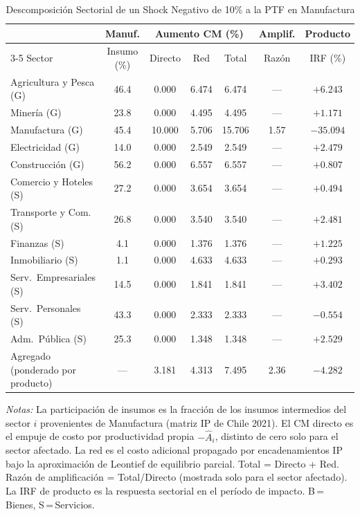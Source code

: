 \begin{table}[htbp]
\centering
\caption{Descomposición Sectorial de un Shock Negativo de 10\% a la PTF en Manufactura}
\label{tab:mfg_decomp}
\begin{threeparttable}
\small
\begin{tabular}{@{}l c c c c c c@{}}
\toprule
 & Manuf. & \multicolumn{3}{c}{Aumento CM (\%)} & Amplif. & Producto \\
\cmidrule(lr){3-5}
Sector & Insumo (\%) & Directo & Red & Total & Razón & IRF (\%) \\
\midrule
Agricultura y Pesca (G) & 46.4 & 0.000 & 6.474 & 6.474 & --- & $+6.243$ \\
Minería (G) & 23.8 & 0.000 & 4.495 & 4.495 & --- & $+1.171$ \\
Manufactura (G) & 45.4 & 10.000 & 5.706 & 15.706 &  1.57 & $-35.094$ \\
Electricidad (G) & 14.0 & 0.000 & 2.549 & 2.549 & --- & $+2.479$ \\
Construcción (G) & 56.2 & 0.000 & 6.557 & 6.557 & --- & $+0.807$ \\
Comercio y Hoteles (S) & 27.2 & 0.000 & 3.654 & 3.654 & --- & $+0.494$ \\
Transporte y Com. (S) & 26.8 & 0.000 & 3.540 & 3.540 & --- & $+2.481$ \\
Finanzas (S) &  4.1 & 0.000 & 1.376 & 1.376 & --- & $+1.225$ \\
Inmobiliario (S) &  1.1 & 0.000 & 4.633 & 4.633 & --- & $+0.293$ \\
Serv.\ Empresariales (S) & 14.5 & 0.000 & 1.841 & 1.841 & --- & $+3.402$ \\
Serv.\ Personales (S) & 43.3 & 0.000 & 2.333 & 2.333 & --- & $-0.554$ \\
Adm.\ Pública (S) & 25.3 & 0.000 & 1.348 & 1.348 & --- & $+2.529$ \\
\midrule
Agregado (ponderado por producto) & --- & 3.181 & 4.313 & 7.495 &  2.36 & $-4.282$ \\
\bottomrule
\end{tabular}
\begin{tablenotes}[flushleft]
\footnotesize
\item \textit{Notas:} La participación de insumos es la fracción de los insumos intermedios del sector $i$ provenientes de Manufactura (matriz IP de Chile 2021). El CM directo es el empuje de costo por productividad propia $-\hat A_i$, distinto de cero solo para el sector afectado. La red es el costo adicional propagado por encadenamientos IP bajo la aproximación de Leontief de equilibrio parcial. Total = Directo + Red. Razón de amplificación = Total/Directo (mostrada solo para el sector afectado). La IRF de producto es la respuesta sectorial en el período de impacto. B\,=\,Bienes, S\,=\,Servicios.
\end{tablenotes}
\end{threeparttable}
\end{table}
